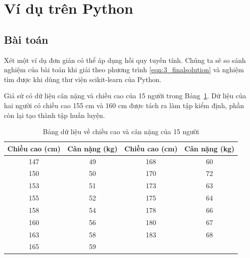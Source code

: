 





\section{Ví dụ trên Python}


\subsection{Bài toán}

Xét một ví dụ đơn giản có thể áp dụng hồi quy tuyến tính. Chúng ta sẽ so
sánh nghiệm của bài toán khi giải theo phương trình \eqref{eqn:3_finalsolution}
và nghiệm tìm được khi dùng thư viện scikit-learn của Python.

Giả sử có dữ liệu cân nặng và chiều cao của 15 người trong Bảng~\ref{tab:3_height_weight}. Dữ liệu của hai người có chiều cao 155 cm và 160 cm được tách ra làm tập kiểm định, phần còn lại tạo thành tập huấn luyện.

\begin{table}[h!]
\centering
\caption{Bảng dữ liệu về chiều cao và cân nặng của 15 người}
\label{tab:3_height_weight}
\begin{tabular}{|c|c||c|c|}
\hline
\textbf{Chiều cao (cm)} & \textbf{Cân nặng (kg)} & \textbf{Chiều cao (cm)} & \textbf{Cân nặng (kg)} \\ \hline
\hline 
147                     & 49                     & 168                     & 60                     \\ \hline
150                     & 50                     & 170                     & 72                     \\ \hline
153                     & 51                     & 173                     & 63                     \\ \hline
155                     & 52                     & 175                     & 64                     \\ \hline
158                     & 54                     & 178                     & 66                     \\ \hline
160                     & 56                     & 180                     & 67                     \\ \hline
163                     & 58                     & 183                     & 68                     \\ \hline
165                     & 59                     &                         &                        \\ \hline
\end{tabular}
\end{table}

